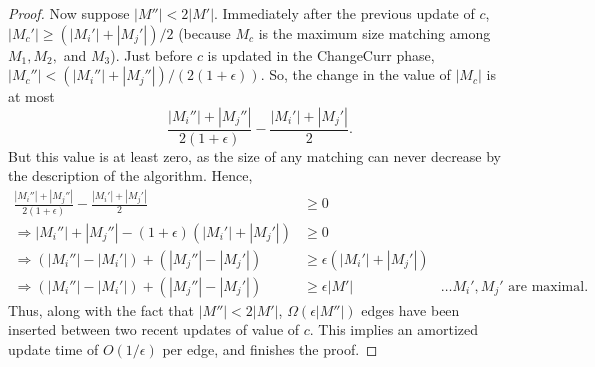 \documentclass[11pt]{article}
\begin{document}
\begin{proof}
 Now suppose $|M''| <2|M'|$. Immediately after the previous update of $c$, $|M_c'|\geq (|M_i'|+|M_j'|)/2$ (because $M_c$ is the maximum size matching among $M_1,M_2,$ and $M_3$). Just before $c$ is updated in the ChangeCurr phase, $|M_c''| < (|M_i''|+|M_j''|)/(2(1+\epsilon))$. So, the change in the value of $|M_c|$ is at most
 \[
  \frac{|M_i''|+|M_j''|}{2(1+\epsilon)} - \frac{|M_i'|+|M_j'|}{2}.
 \]
But this value is at least zero, as the size of any matching can never decrease by the description of the algorithm. Hence,
\begin{align*}
 \frac{|M_i''|+|M_j''|}{2(1+\epsilon)} - \frac{|M_i'|+|M_j'|}{2} &\geq 0 \\
 \Longrightarrow |M_i''|+|M_j''| - (1+\epsilon)(|M_i'|+|M_j'|) &\geq 0 \\
 \Longrightarrow (|M_i''|-|M_i'|)+(|M_j''|-|M_j'|) &\geq \epsilon(|M_i'|+|M_j'|) \\
 \Longrightarrow (|M_i''|-|M_i'|)+(|M_j''|-|M_j'|) &\geq \epsilon|M'| &\dots M_i',M_j'\text{ are maximal} .
\end{align*}
Thus, along with the fact that $|M''| <2|M'|$, $\Omega(\epsilon|M''|)$ edges have been inserted between two recent updates of value of $c$. This implies an amortized update time of $O(1/\epsilon)$ per edge, and finishes the proof.
 
 

\end{proof}
\end{document}
